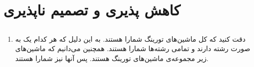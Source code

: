 \section{کاهش پذیری و تصمیم ناپذیری}
\subsection{}
\begin{enumerate}
    \item دقت کنید که کل ماشین‌های تورینگ شمارا هستند. به این دلیل که هر کدام یک
    به صورت رشته دارند و تمامی رشته‌ها شمارا هستند. همچنین می‌دانیم که ماشین‌های
    زیر مجموعه‌ی ماشین‌های تورینگ هستند. پس آنها نیز شمارا هستند.
\end{enumerate}